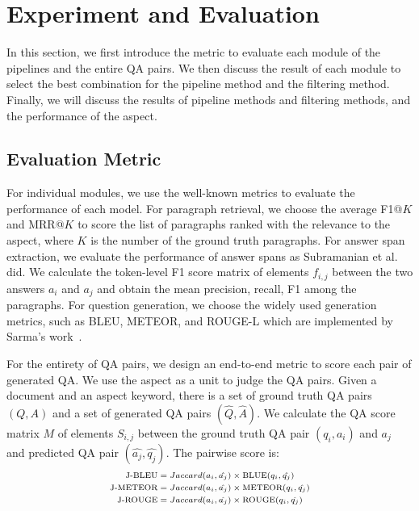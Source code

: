 \section{Experiment and Evaluation}
\label{sec:eval}
In this section, we first introduce the metric to evaluate each module of the pipelines and the entire QA pairs.
We then discuss the result of each module to select the best combination for the pipeline method and the filtering method.
Finally, we will discuss the results of pipeline methods and filtering methods, and the performance of the aspect.

\subsection{Evaluation Metric}
For individual modules, we use the well-known metrics to evaluate the performance of each model.
For paragraph retrieval, we choose the average F1@$K$ and MRR@$K$ to score the list of paragraphs ranked with the relevance to the aspect, where $K$ is the number of the ground truth paragraphs.
For answer span extraction, we evaluate the performance of answer spans as Subramanian et al.~ did. 
We calculate the token-level F1 score matrix of elements $f_{i,j}$ between the two answers $a_i$ and $a_j$ and obtain the mean precision, recall, F1 among the paragraphs.
For question generation, we choose the widely used generation metrics, such as BLEU, METEOR, and ROUGE-L which are implemented by Sarma's work~\cite{sharma2017relevance}.

For the entirety of QA pairs, we design an end-to-end metric to score each pair of generated QA.
We use the aspect as a unit to judge the QA pairs.
Given a document and an aspect keyword, there is a set of ground truth QA pairs $(Q, A)$ and a set of generated QA pairs $(\hat{Q}, \hat{A})$.
We calculate the QA score matrix $M$ of elements $S_{i,j}$ between the ground truth QA pair $(q_i, a_i)$ and $a_j$ and predicted QA pair $(\hat{a_j}, \hat{q_j})$.
The pairwise score is:
\begin{equation}
\scriptsize
\begin{aligned}
\text{J-BLEU} &= Jaccard(a_i, \hat{a_j})\times \text{BLUE}(q_i, \hat{q_j})\\
\text{J-METEOR} &=Jaccard(a_i, \hat{a_j})\times \text{METEOR}(q_i, \hat{q_j})\\
\text{J-ROUGE} &= Jaccard(a_i, \hat{a_j})\times \text{ROUGE}(q_i, \hat{q_j})\\
\end{aligned}
\end{equation}

